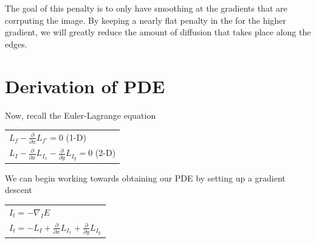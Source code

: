 \documentclass{article}
\begin{document}
  \noindent
  The goal of this penalty is to only have smoothing at the gradients
  that are corrputing the image. By keeping a nearly flat penalty in the for
  the higher gradient, we will greatly reduce the amount of diffusion that
  takes place along the edges.



  \newpage
  \section{Derivation of PDE}

    \noindent Now, recall the Euler-Lagrange equation
      \begin{center}
        \begin{tabular}{l}
          $L_{f} - \frac{\partial}{\partial x}L_{f'} = 0$ (1-D)\\
          $L_{I} - \frac{\partial}{\partial x}L_{I_{x}} - \frac{\partial}{\partial y}L_{I_{y}} = 0$ (2-D)\\
        \end{tabular}
      \end{center}
    \vspace{12pt}

    \noindent
    We can begin working towards obtaining our PDE by setting up a gradient descent
      \begin{center}
        \begin{tabular}{l}
          $I_{t} = -\nabla_{I}E$\\
          $I_{t} = -L_{I} + \frac{\partial}{\partial x}L_{I_{x}} + \frac{\partial}{\partial y}L_{I_{y}}$
        \end{tabular}
      \end{center}
    \vspace{12pt}
\end{document}
